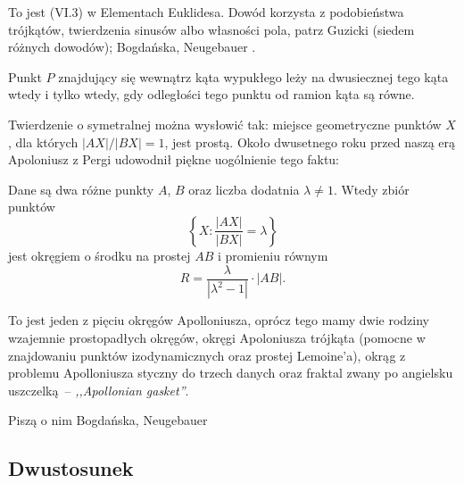 To jest (VI.3) w Elementach Euklidesa.
Dowód korzysta z podobieństwa trójkątów, twierdzenia sinusów albo własności pola, patrz Guzicki \cite[s. 120]{guzicki_2021} (siedem różnych dowodów); Bogdańska, Neugebauer \cite[s. 73]{neugebauer_2018}.

\begin{proposition} %
	Punkt $P$ znajdujący się wewnątrz kąta wypukłego leży na dwusiecznej tego kąta wtedy i tylko wtedy, gdy odległości tego punktu od ramion kąta są równe.
\end{proposition}




Twierdzenie o symetralnej %
można wysłowić tak: miejsce geometryczne punktów $X$, dla których $|AX|/|BX| = 1$, jest prostą.
Około dwusetnego roku przed naszą erą Apoloniusz z Pergi udowodnił piękne uogólnienie tego faktu:

\begin{definition} %
	Dane są dwa różne punkty $A$, $B$ oraz liczba dodatnia $\lambda \neq 1$.
	Wtedy zbiór punktów 
	\begin{equation}
		\left\{X : \frac{|AX|}{|BX|} = \lambda \right\}
	\end{equation}
	jest okręgiem o środku na prostej $AB$ i promieniu równym
	\begin{equation}
		R = \frac{\lambda}{|\lambda^2 - 1|} \cdot |AB|.
	\end{equation}
\end{definition}

To jest jeden z pięciu okręgów Apolloniusza, oprócz tego mamy dwie rodziny wzajemnie prostopadłych okręgów, okręgi Apoloniusza trójkąta (pomocne w znajdowaniu punktów izodynamicznych oraz prostej Lemoine'a), okrąg z problemu Apolloniusza styczny do trzech danych oraz fraktal zwany po angielsku uszczelką -- \emph{,,Apollonian gasket''}.

Piszą o nim Bogdańska, Neugebauer \cite[s. 74]{neugebauer_2018}



\subsection{Dwustosunek}

